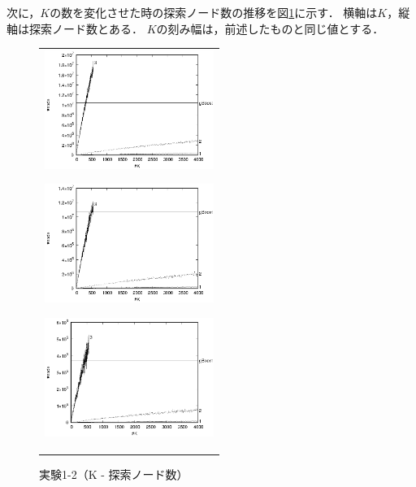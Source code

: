 次に，$K$の数を変化させた時の探索ノード数の推移を図\ref{1-2}に示す．
横軸は$K$，縦軸は探索ノード数とある．
$K$の刻み幅は，前述したものと同じ値とする．
\begin{figure}[t]
	\begin{center}
		\begin{tabular}{c}
			\begin{minipage}{0.33\hsize}
				\begin{center}
					\includegraphics[width=55mm]{cpdb/node_1.eps}
				\end{center}
				\vspace{0.5cm}
				\subcaption{$\nu = 0.1$}
				\label{fig:4}
			\end{minipage}
			\begin{minipage}{0.33\hsize}
				\begin{center}
					\includegraphics[width=55mm]{cpdb/node_3.eps}
				\end{center}
				\vspace{0.5cm}
				\subcaption{$\nu = 0.3$}
				\label{fig:5}
			\end{minipage}
			\begin{minipage}{0.33\hsize}
				\begin{center}
					\includegraphics[width=55mm]{cpdb/node_5.eps}
				\end{center}
				\vspace{0.5cm}
				\subcaption{$\nu = 0.5$}
				\label{fig:6}
			\end{minipage}
			\vspace{0.5cm}
		\end{tabular}
		\caption{実験1-2（K - 探索ノード数）}
		\label{1-2}
	\end{center}
\end{figure}

